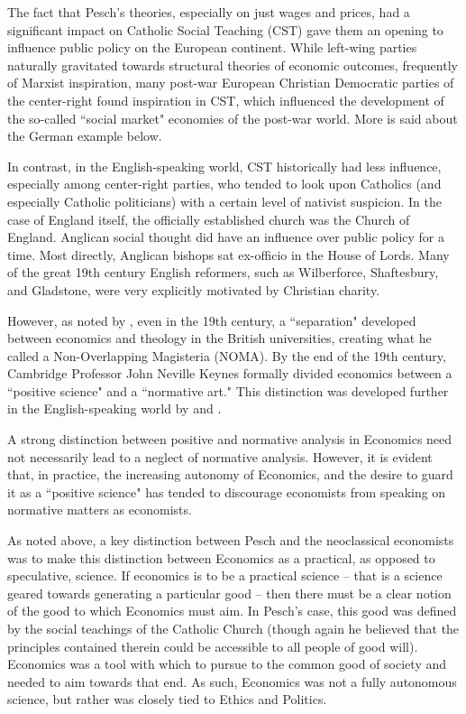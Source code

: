 \documentclass{article}
\begin{document}
The fact that Pesch’s theories, especially on just wages and prices, had a significant impact on Catholic Social Teaching (CST) gave them an opening to influence public policy on the European continent.  While left-wing parties naturally gravitated towards structural theories of economic outcomes, frequently of Marxist inspiration, many post-war European Christian Democratic parties of the center-right found inspiration in CST, which influenced the development of the so-called ``social market" economies of the post-war world.  More is said about the German example below.\medskip

In contrast, in the English-speaking world, CST historically had less influence, especially among center-right parties, who tended to look upon Catholics (and especially Catholic politicians) with a certain level of nativist suspicion.  In the case of England itself, the officially established church was the Church of England.  Anglican social thought did have an influence over public policy for a time.  Most directly, Anglican bishops sat ex-officio in the House of Lords.  Many of the great 19th century English reformers, such as Wilberforce, Shaftesbury, and Gladstone, were very explicitly motivated by Christian charity. \citep{hawtrey2014}\medskip

However, as noted by \citet{emmett2014}, even in the 19th century, a ``separation" developed between economics and theology in the British universities, creating what he called a Non-Overlapping Magisteria (NOMA).  By the end of the 19th century, Cambridge Professor John Neville Keynes formally divided economics between a ``positive science" and a ``normative art." \citep{keynes1904}  This distinction was developed further in the English-speaking world by \citet{robbins1932} and \citet{friedman1953}.\medskip

A strong distinction between positive and normative analysis in Economics need not necessarily lead to a neglect of normative analysis.  However, it is evident that, in practice, the increasing autonomy of Economics, and the desire to guard it as a ``positive science" has tended to discourage economists from speaking on normative matters as economists.\medskip

As noted above, a key distinction between Pesch and the neoclassical economists was to make this distinction between Economics as a practical, as opposed to speculative, science.  If economics is to be a practical science – that is a science geared towards generating a particular good – then there must be a clear notion of the good to which Economics must aim.  In Pesch’s case, this good was defined by the social teachings of the Catholic Church (though again he believed that the principles contained therein could be accessible to all people of good will).  Economics was a tool with which to pursue to the common good of society and needed to aim towards that end.  As such, Economics was not a fully autonomous science, but rather was closely tied to Ethics and Politics.\medskip
\end{document}
